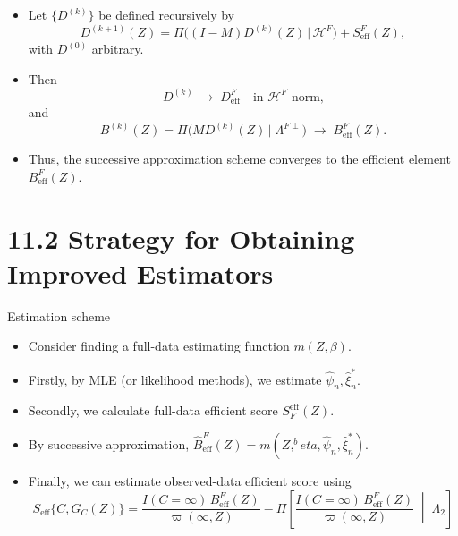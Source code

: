 \documentclass[xcolor=dvipsnames,aspectratio=169]{beamer}
\newcommand{\1}{\mathbbm{1}}
\begin{document}
\begin{frame}
  \begin{tcolorbox}[colframe=lightgray,title=Lemma 11.2]
    \begin{itemize}
      \item Let $\{D^{(k)}\}$ be defined recursively by
      \[
        D^{(k+1)}(Z)
        =
        \Pi\!\Big((I-M)D^{(k)}(Z)\,\Big|\,\mathcal{H}^{F}\Big)
        + S^{F}_{\mathrm{eff}}(Z),
      \]
      with $D^{(0)}$ arbitrary.
      \item Then
      \[
        D^{(k)} \;\longrightarrow\; D^{F}_{\mathrm{eff}}
        \quad\text{in $\mathcal{H}^{F}$ norm,}
      \]
      and
      \[
        B^{(k)}(Z)
        = \Pi\!\big(MD^{(k)}(Z)\,\big|\;\Lambda^{F\perp}\big)
        \;\longrightarrow\; B^{F}_{\mathrm{eff}}(Z).
      \]
      \item Thus, the successive approximation scheme converges to the efficient element $B^{F}_{\mathrm{eff}}(Z)$.
    \end{itemize}
  \end{tcolorbox}
\end{frame}

\section{11.2 Strategy for Obtaining Improved Estimators}

\begin{frame}{Estimation scheme}
  \begin{itemize}
    \item Consider finding a full-data estimating function $m(Z,\beta)$.
    \item Firstly, by MLE (or likelihood methods), we estimate $\hat{\psi}_n, \hat{\xi}_n^*$.
    \item Secondly, we calculate full-data efficient score $S^{\mathrm{eff}}_{F}(Z)$.
    \item By successive approximation, $\hat{B}^{F}_{\mathrm{eff}}(Z)=m(Z,^beta,\hat{\psi}_n, \hat{\xi}_n^*)$.
    \item Finally, we can estimate observed-data efficient score using
    \[
    S_{\mathrm{eff}}\{C,G_C(Z)\}
=
\frac{I(C=\infty)\,B^{F}_{\mathrm{eff}}(Z)}{\varpi(\infty,Z)}
-
\Pi\!\left[
  \frac{I(C=\infty)\,B^{F}_{\mathrm{eff}}(Z)}{\varpi(\infty,Z)}
  \;\middle|\; \Lambda_2
\right]
    \]
  \end{itemize}
\end{frame}
\end{document}

